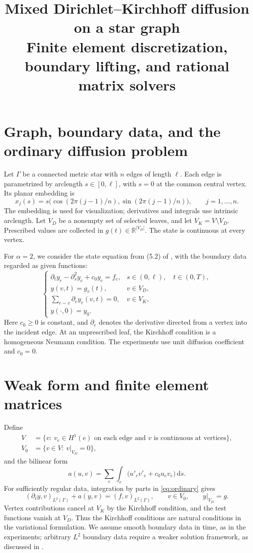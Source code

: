 \documentclass[11pt,a4paper]{article}
\title{Mixed Dirichlet--Kirchhoff diffusion on a star graph\\
\large Finite element discretization, boundary lifting, and rational matrix solvers}
\author{}
\date{}
\newcommand{\R}{\mathbb R}
\newcommand{\G}{\Gamma}
\newcommand{\ip}[2]{\left(#1,#2\right)_{L^2(\G)}}
\newcommand{\dd}{\,\mathrm d}
\begin{document}
\maketitle

\section{Graph, boundary data, and the ordinary diffusion problem}
Let $\G$ be a connected metric star with $n$ edges of length $\ell$.
Each edge is parametrized by arclength $s\in[0,\ell]$, with $s=0$
at the common central vertex. Its planar embedding is
\[
 x_j(s)=s\bigl(\cos(2\pi(j-1)/n),\sin(2\pi(j-1)/n)\bigr),
 \qquad j=1,\ldots,n.
\]
The embedding is used for visualization; derivatives and integrals use
intrinsic arclength. Let $V_D$ be a nonempty set of selected leaves,
and let $V_K=V\setminus V_D$. Prescribed values are collected in
$g(t)\in\R^{|V_D|}$. The state is continuous at every vertex.

For $\alpha=2$, we consider the state equation from (5.2) of
\cite{stoll}, with the boundary data regarded as given functions:
\begin{equation}\label{eq:ordinary}
\begin{cases}
 \partial_t y_e-\partial_s^2 y_e+c_0y_e=f_e,
       &s\in(0,\ell),\quad t\in(0,T),\\
 y(v,t)=g_v(t),&v\in V_D,\\
 \displaystyle\sum_{e\sim v}\partial_e y_e(v,t)=0,&v\in V_K,\\
 y(\cdot,0)=y_0.&
\end{cases}
\end{equation}
Here $c_0\geq0$ is constant, and $\partial_e$ denotes the derivative
directed from a vertex into the incident edge. At an unprescribed leaf,
the Kirchhoff condition is a homogeneous Neumann condition. The experiments
use unit diffusion coefficient and $c_0=0$.

\section{Weak form and finite element matrices}
Define
\begin{align*}
 V&=\{v:\ v_e\in H^1(e)\text{ on each edge and }v
       \text{ is continuous at vertices}\},\\
 V_0&=\{v\in V:\ v|_{V_D}=0\},
\end{align*}
and the bilinear form
\[
 a(u,v)=\sum_e\int_e\bigl(u'_e v'_e+c_0u_ev_e\bigr)\dd s.
\]
For sufficiently regular data, integration by parts in
\eqref{eq:ordinary} gives
\begin{equation}\label{eq:weak}
 \ip{\partial_t y}{v}+a(y,v)=\ip{f}{v},\qquad v\in V_0,
 \qquad y|_{V_D}=g.
\end{equation}
Vertex contributions cancel at $V_K$ by the Kirchhoff condition, and
the test functions vanish at $V_D$. Thus the Kirchhoff conditions are
natural conditions in the variational formulation. We assume smooth
boundary data in time, as in the experiments; arbitrary $L^2$ boundary
data require a weaker solution framework, as discussed in \cite{stoll}.
\end{document}
